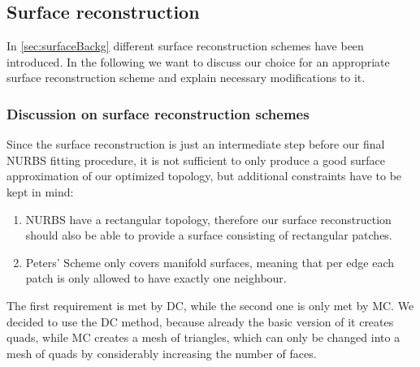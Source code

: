 \subsection{Surface reconstruction}
In \autoref{sec:surfaceBackg} different surface reconstruction schemes have been introduced. In the following we want to discuss our choice for an appropriate surface reconstruction scheme and explain necessary modifications to it.

\subsubsection{Discussion on surface reconstruction schemes}
Since the surface reconstruction is just an intermediate step before our final \ac{NURBS} fitting procedure, it is not sufficient to only produce a good surface approximation of our optimized topology, but additional constraints have to be kept in mind:
\begin{enumerate}
\item \ac{NURBS} have a rectangular topology, therefore our surface reconstruction should also be able to provide a surface consisting of rectangular patches.
\item Peters' Scheme only covers manifold surfaces, meaning that per edge each patch is only allowed to have exactly one neighbour.
\end{enumerate}
The first requirement is met by \ac{DC}, while the second one is only met by \ac{MC}. We decided to use the \ac{DC} method, because already the basic version of it creates \acp{quad}, while \ac{MC} creates a mesh of triangles, which can only be changed into a mesh of \acp{quad} by considerably increasing the number of faces.

